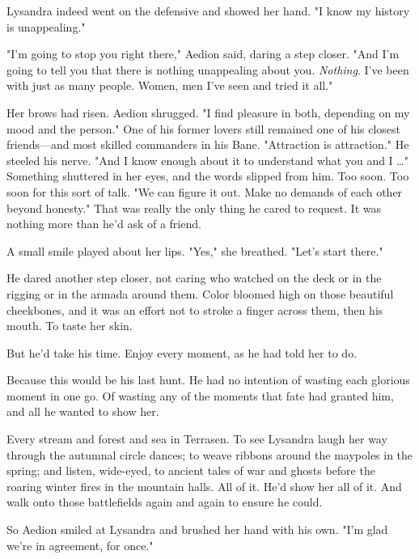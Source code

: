 Lysandra indeed went on the defensive and showed her hand. "I know my history is  unappealing."

"I'm going to stop you right there," Aedion said, daring a step closer. "And I'm going to tell you that there is nothing unappealing about you. \emph{Nothing}. I've been with just as many people. Women, men  I've seen and tried it all."

Her brows had risen. Aedion shrugged. "I find pleasure in both, depending on my mood and the person." One of his former lovers still remained one of his closest friends---and most skilled commanders in his Bane. "Attraction is attraction." He steeled his nerve. "And I know enough about it to understand what you and I \ldots" Something shuttered in her eyes, and the words slipped from him. Too soon. Too soon for this sort of talk. "We can figure it out. Make no demands of each other beyond honesty." That was really the only thing he cared to request. It was nothing more than he'd ask of a friend.

A small smile played about her lips. "Yes," she breathed. "Let's start there."

He dared another step closer, not caring who watched on the deck or in the rigging or in the armada around them. Color bloomed high on those beautiful cheekbones, and it was an effort not to stroke a finger across them, then his mouth. To taste her skin.

But he'd take his time. Enjoy every moment, as he had told her to do.

Because this would be his last hunt. He had no intention of wasting each glorious moment in one go. Of wasting any of the moments that fate had granted him, and all he wanted to show her.

Every stream and forest and sea in Terrasen. To see Lysandra laugh her way through the autumnal circle dances; to weave ribbons around the maypoles in the spring; and listen, wide-eyed, to ancient tales of war and ghosts before the roaring winter fires in the mountain halls. All of it. He'd show her all of it. And walk onto those battlefields again and again to ensure he could.

So Aedion smiled at Lysandra and brushed her hand with his own. "I'm glad we're in agreement, for once."

